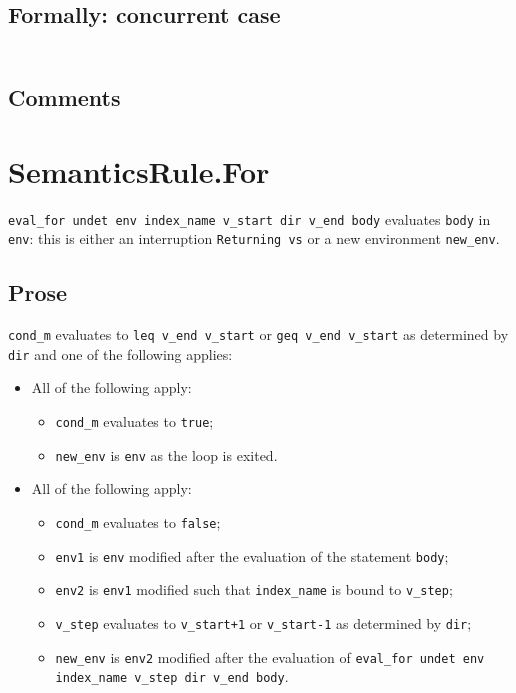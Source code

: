 \documentclass{book}
\begin{document}
  \subsection{Formally: concurrent case}
  \begin{align}
  \end{align} 

    \subsection{Comments}

\section{SemanticsRule.For \label{sec:SemanticsRule.For}}
\texttt{eval\_for undet env index\_name v\_start dir v\_end body} evaluates
\texttt{body} in \texttt{env}: this is either an interruption \texttt{Returning
vs} or a new environment \texttt{new\_env}.

    \subsection{Prose}
    \texttt{cond\_m} evaluates to \texttt{leq v\_end v\_start} or \texttt{geq
v\_end v\_start} as determined by \texttt{dir} and one of the following
applies:
    \begin{itemize}
    \item All of the following apply:
      \begin{itemize}
      \item \texttt{cond\_m} evaluates to \texttt{true};
      \item \texttt{new\_env} is \texttt{env} as the loop is exited.
      \end{itemize}
    \item All of the following apply:
      \begin{itemize}
      \item \texttt{cond\_m} evaluates to \texttt{false};
      \item \texttt{env1} is \texttt{env} modified after the evaluation of the statement \texttt{body};
      \item \texttt{env2} is \texttt{env1} modified such that \texttt{index\_name} is bound to \texttt{v\_step};
      \item \texttt{v\_step} evaluates to \texttt{v\_start+1} or \texttt{v\_start-1} as determined by \texttt{dir};
      \item \texttt{new\_env} is \texttt{env2} modified after the evaluation of \texttt{eval\_for undet
        env index\_name v\_step dir v\_end body}.
      \end{itemize}
    \end{itemize}
\end{document}
